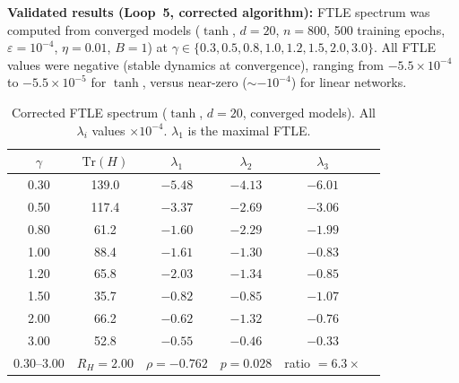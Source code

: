 \documentclass[
  journal=largetwo,
  simfonts=false,
  year=2025,
  volume=37,
]{cup-journal}
\begin{document}
\textbf{Validated results (Loop~5, corrected algorithm):} FTLE spectrum was computed from converged models ($\tanh$, $d=20$, $n=800$, 500 training epochs, $\varepsilon = 10^{-4}$, $\eta = 0.01$, $B=1$) at $\gamma \in \{0.3, 0.5, 0.8, 1.0, 1.2, 1.5, 2.0, 3.0\}$. All FTLE values were negative (stable dynamics at convergence), ranging from $-5.5\times 10^{-4}$ to $-5.5\times 10^{-5}$ for $\tanh$, versus near-zero ($\sim -10^{-4}$) for linear networks.

\begin{table}[htb]
\centering
\scriptsize
\setlength{\tabcolsep}{4pt}
\caption{Corrected FTLE spectrum ($\tanh$, $d=20$, converged models). All $\lambda_i$ values $\times 10^{-4}$. $\lambda_1$ is the maximal FTLE.}
\label{tab:ftle_corrected}
\begin{tabular}{ cccccc }
\toprule
$\gamma$ & $\mathrm{Tr}(H)$ & $\lambda_1$ & $\lambda_2$ & $\lambda_3$ \\
\midrule
0.30 & 139.0 & $-5.48$ & $-4.13$ & $-6.01$ \\
0.50 & 117.4 & $-3.37$ & $-2.69$ & $-3.06$ \\
0.80 & 61.2  & $-1.60$ & $-2.29$ & $-1.99$ \\
1.00 & 88.4  & $-1.61$ & $-1.30$ & $-0.83$ \\
1.20 & 65.8  & $-2.03$ & $-1.34$ & $-0.85$ \\
1.50 & 35.7  & $-0.82$ & $-0.85$ & $-1.07$ \\
2.00 & 66.2  & $-0.62$ & $-1.32$ & $-0.76$ \\
3.00 & 52.8  & $\mathbf{-0.55}$ & $-0.46$ & $-0.33$ \\
\midrule
0.30--3.00 & $R_H=2.00$ & $\rho=-0.762$ & $p=0.028$ & ratio $=6.3\times$ \\
\bottomrule
\end{tabular}
\end{table}
\end{document}
